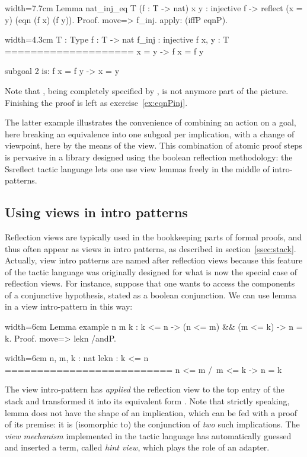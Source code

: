 \begin{coq}{}{width=7.7cm}
Lemma nat_inj_eq T (f : T -> nat) x y :
  injective f ->
    reflect (x = y) (eqn (f x) (f y)).
Proof.
move=> f_inj.
apply: (iffP eqnP).
\end{coq}
\begin{coqout}{}{width=4.3cm}
T : Type
f : T -> nat
f_inj : injective f
x, y : T
====================
x = y -> f x = f y

subgoal 2 is:
 f x = f y -> x = y
\end{coqout}
Note that , being completely specified by , is not
anymore part of the picture.  Finishing the proof is left as
exercise~\ref{ex:eqnPinj}.

The latter example illustrates the convenience of combining an action
on a goal, here breaking an equivalence into one subgoal per
implication, with a change of viewpoint, here by the means of the
 view. This combination of atomic proof steps is pervasive in
a library designed using the boolean reflection methodology: the
Ssreflect tactic language lets one use view lemmas freely
in the middle of intro-patterns.

\subsection{Using views in intro patterns}

Reflection views are typically used in the bookkeeping parts of formal
proofs, and thus often appear as views in intro patterns, as described
in section~\ref{ssec:stack}. Actually, view intro patterns are named
after reflection views because this feature of the tactic language was
originally designed for what is now the special case of reflection
views. For instance, suppose
that one wants to access the components of a conjunctive hypothesis,
stated as a boolean conjunction. We can use lemma  in a view
intro-pattern in this way:

\begin{coq}{}{width=6cm}
Lemma example n m k : k <= n ->
  (n <= m) && (m <= k) -> n = k.
Proof.
move=> lekn /andP.
\end{coq}
\begin{coqout}{}{width=6cm}
n, m, k : nat
lekn : k <= n
==========================
 n <= m /\ m <= k -> n = k
\end{coqout}

The view intro-pattern  has \emph{applied} the reflection
view  to
the top entry of the stack  and transformed it into
its equivalent form . Note that strictly
speaking, lemma  does not have the shape of an implication,
which can be fed with a proof of its premise: it is (isomorphic to) the
conjunction of \emph{two} such implications. The \emph{view mechanism}
implemented in the tactic language has automatically guessed and
inserted a term, called \emph{hint view}, which plays the role of an
adapter.

